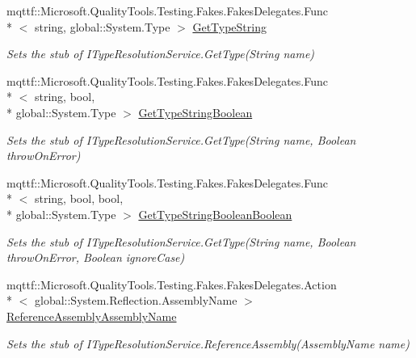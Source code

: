 \begin{DoxyCompactItemize}
mqttf\-::\-Microsoft.\-Quality\-Tools.\-Testing.\-Fakes.\-Fakes\-Delegates.\-Func\\*
$<$ string, global\-::\-System.\-Type $>$ \hyperlink{class_system_1_1_component_model_1_1_design_1_1_fakes_1_1_stub_i_type_resolution_service_a9edd248eb73fadf587e60b8327ca68fe}{Get\-Type\-String}
\begin{DoxyCompactList}\small\item\em Sets the stub of I\-Type\-Resolution\-Service.\-Get\-Type(\-String name)\end{DoxyCompactList}\item 
mqttf\-::\-Microsoft.\-Quality\-Tools.\-Testing.\-Fakes.\-Fakes\-Delegates.\-Func\\*
$<$ string, bool, \\*
global\-::\-System.\-Type $>$ \hyperlink{class_system_1_1_component_model_1_1_design_1_1_fakes_1_1_stub_i_type_resolution_service_a6b304aef6de1197c409609f420eeaebd}{Get\-Type\-String\-Boolean}
\begin{DoxyCompactList}\small\item\em Sets the stub of I\-Type\-Resolution\-Service.\-Get\-Type(\-String name, Boolean throw\-On\-Error)\end{DoxyCompactList}\item 
mqttf\-::\-Microsoft.\-Quality\-Tools.\-Testing.\-Fakes.\-Fakes\-Delegates.\-Func\\*
$<$ string, bool, bool, \\*
global\-::\-System.\-Type $>$ \hyperlink{class_system_1_1_component_model_1_1_design_1_1_fakes_1_1_stub_i_type_resolution_service_ace763f0294ae2e19bff2b48c10bc60ff}{Get\-Type\-String\-Boolean\-Boolean}
\begin{DoxyCompactList}\small\item\em Sets the stub of I\-Type\-Resolution\-Service.\-Get\-Type(\-String name, Boolean throw\-On\-Error, Boolean ignore\-Case)\end{DoxyCompactList}\item 
mqttf\-::\-Microsoft.\-Quality\-Tools.\-Testing.\-Fakes.\-Fakes\-Delegates.\-Action\\*
$<$ global\-::\-System.\-Reflection.\-Assembly\-Name $>$ \hyperlink{class_system_1_1_component_model_1_1_design_1_1_fakes_1_1_stub_i_type_resolution_service_a9faa493d9c96bb8516f30e240c1c2398}{Reference\-Assembly\-Assembly\-Name}
\begin{DoxyCompactList}\small\item\em Sets the stub of I\-Type\-Resolution\-Service.\-Reference\-Assembly(\-Assembly\-Name name)\end{DoxyCompactList}\end{DoxyCompactItemize}


